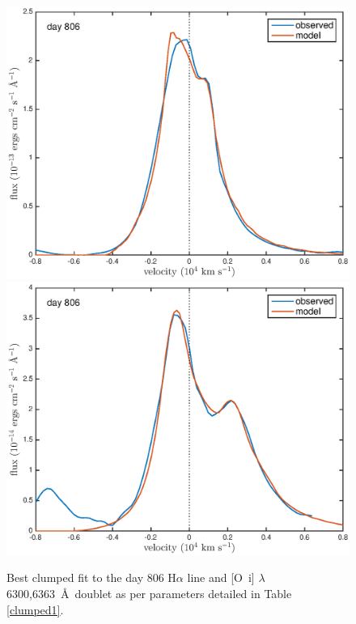 \documentclass[useAMS,usenatbib,usegraphicx]{mnras}
\begin{document}
\begin{figure}
\begin{center}
\includegraphics[trim =37 10 45 15,clip=true,scale=0.51]{clump_1/best_fit/d806Ha}
\includegraphics[trim =35 10 45 15,clip=true,scale=0.51]{clump_1/best_fit/d806OI}
\caption{Best clumped fit to the day 806 H$\alpha$ line and 
[O~{\sc i}] $\lambda$6300,6363~\AA\ doublet as per parameters detailed in Table 
\ref{clumped1}.}
\label{d806_c}
\end{center}
\end{figure}
\end{document}
